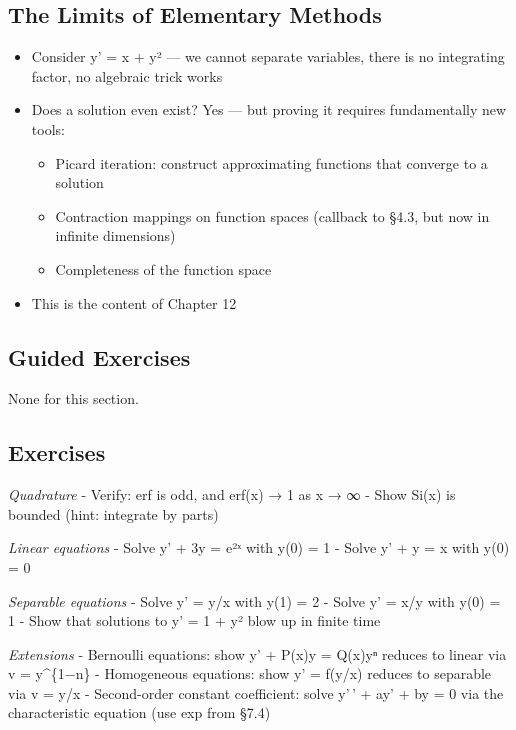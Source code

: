 \documentclass[
  10pt,
  letterpaper,
]{scrbook}
\providecommand{\tightlist}{%
  \setlength{\itemsep}{0pt}\setlength{\parskip}{0pt}}
\begin{document}
\subsection{The Limits of Elementary
Methods}\label{the-limits-of-elementary-methods}

\begin{itemize}
\tightlist
\item
  Consider y' = x + y² --- we cannot separate variables, there is no
  integrating factor, no algebraic trick works
\item
  Does a solution even exist? Yes --- but proving it requires
  fundamentally new tools:

  \begin{itemize}
  \tightlist
  \item
    Picard iteration: construct approximating functions that converge to
    a solution
  \item
    Contraction mappings on function spaces (callback to §4.3, but now
    in infinite dimensions)
  \item
    Completeness of the function space
  \end{itemize}
\item
  This is the content of Chapter 12
\end{itemize}

\subsection{Guided Exercises}\label{guided-exercises-21}

None for this section.

\subsection{Exercises}\label{exercises-40}

\emph{Quadrature} - Verify: erf is odd, and erf(x) → 1 as x → ∞ - Show
Si(x) is bounded (hint: integrate by parts)

\emph{Linear equations} - Solve y' + 3y = e²ˣ with y(0) = 1 - Solve y' +
y = x with y(0) = 0

\emph{Separable equations} - Solve y' = y/x with y(1) = 2 - Solve y' =
x/y with y(0) = 1 - Show that solutions to y' = 1 + y² blow up in finite
time

\emph{Extensions} - Bernoulli equations: show y' + P(x)y = Q(x)yⁿ
reduces to linear via v = y\^{}\{1−n\} - Homogeneous equations: show y'
= f(y/x) reduces to separable via v = y/x - Second-order constant
coefficient: solve y'\,' + ay' + by = 0 via the characteristic equation
(use exp from §7.4)
\end{document}

